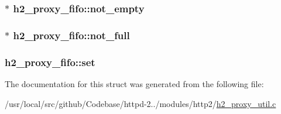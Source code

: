 \subsubsection[{\texorpdfstring{not\+\_\+empty}{not_empty}}]{$\ast$ h2\+\_\+proxy\+\_\+fifo\+::not\+\_\+empty}\hypertarget{structh2__proxy__fifo_a95b47f447bf33aae8528d2b2bd805416}{}\label{structh2__proxy__fifo_a95b47f447bf33aae8528d2b2bd805416}
\subsubsection[{\texorpdfstring{not\+\_\+full}{not_full}}]{$\ast$ h2\+\_\+proxy\+\_\+fifo\+::not\+\_\+full}\hypertarget{structh2__proxy__fifo_ad572180d4bd8ba94a6f469a05dfe68b6}{}\label{structh2__proxy__fifo_ad572180d4bd8ba94a6f469a05dfe68b6}
\subsubsection[{\texorpdfstring{set}{set}}]{ h2\+\_\+proxy\+\_\+fifo\+::set}\hypertarget{structh2__proxy__fifo_a89ffed46d24de481f119508708e243ee}{}\label{structh2__proxy__fifo_a89ffed46d24de481f119508708e243ee}


The documentation for this struct was generated from the following file\+:\begin{DoxyCompactItemize}
\item 
/usr/local/src/github/\+Codebase/httpd-\/2../modules/http2/\hyperlink{h2__proxy__util_8c}{h2\+\_\+proxy\+\_\+util.\+c}\end{DoxyCompactItemize}
